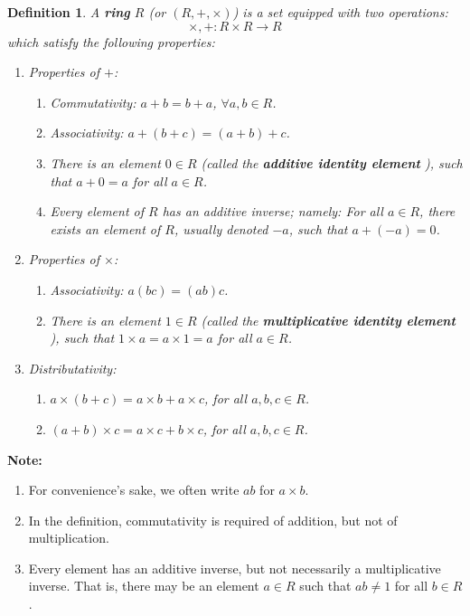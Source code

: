 \documentclass[a4paper,12pt]{report}
\newcounter{statement}
\numberwithin{statement}{chapter}
\newtheorem{defn}[statement]{Definition}
\numberwithin{equation}{chapter}
\numberwithin{section}{chapter}
\numberwithin{subsection}{section}
\begin{document}
\begin{defn}
A  {\bf  ring}  $R$ (or $(R, +, \times)$) is a set equipped with two operations:
\[
\times, + : R\times R \rightarrow R
\]
which satisfy the following properties:
\begin{enumerate}
\item  Properties of $+$:
  \begin{enumerate}
\item 
  Commutativity: $a + b = b + a$, $\forall a, b \in R$.
  
\item 
  Associativity: $a + (b + c) = (a + b) + c$.
  
\item 
  There is an element $0 \in R$ (called the  {\bf additive identity element} ),
  such that $a + 0 = a$ for all $a \in R$.
  
\item 
  Every element of $R$ has an additive inverse; namely:
  For all $a \in R$, there exists an element of $R$, usually denoted $-a$,
  such that $a + (-a) = 0$.
  \end{enumerate}

\item  Properties of $\times$:
  \begin{enumerate}
\item 
  Associativity: $a(bc) = (ab)c$.
  
\item 
  There is an element $1 \in R$ (called the  {\bf multiplicative identity element} ),
  such that $1\times a = a\times 1 = a$ for all $a \in R$.
  \end{enumerate}

\item  Distributativity:
\begin{enumerate}
\item 
$a\times(b + c) = a\times b + a\times c$, for all $a, b, c \in R$.

\item 
$(a + b) \times c = a \times c + b\times c$, for all $a, b, c \in R$.
\end{enumerate}
\end{enumerate}
\end{defn}



 {\bf Note:} 

\begin{enumerate}
\item 
For convenience's sake, we often write $ab$ for $a\times b$.

\item 
In the definition, commutativity is required of addition, but not of multiplication.

\item 
Every element has an additive inverse, but  not necessarily a multiplicative inverse.
That is, there may be an element $a \in R$ such that $ab \neq 1$ for all $b \in R$.
\end{enumerate}
\end{document}
